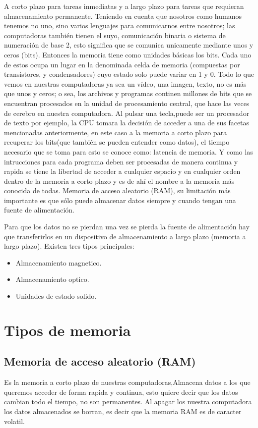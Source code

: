 \documentclass{article}
\begin{document}
A corto plazo para tareas inmediatas y a largo plazo para tareas que requieran almacenamiento permanente. Teniendo en cuenta que nosotros como humanos tenemos no uno, sino varios lenguajes para comunicarnos entre nosotros; las computadoras también tienen el suyo, comunicación binaria o sistema de numeración de base 2, esto significa que se comunica unicamente mediante unos y ceros (bits). Entonces la memoria tiene como unidades básicas los bits. Cada uno de estos ocupa un lugar en la denominada celda de memoria (compuestas por transistores, y condensadores) cuyo estado solo puede variar en 1 y 0. Todo lo que vemos en nuestras computadoras ya sea un vídeo, una imagen, texto, no es más que unos y ceros; o sea, los archivos y programas continen millones de bits que se encuentran procesados en la unidad de procesamiento central, que hace las veces de cerebro en nuestra computadora. Al pulsar una tecla,puede ser un procesador de texto por ejemplo, la CPU tomara la decisión de acceder a una de sus facetas mencionadas anteriormente, en este caso a la memoria a corto plazo para recuperar los bits(que también se pueden entender como datos), el tiempo necesario que se toma para esto se conoce como: latencia de memoria. Y como las intrucciones para cada programa deben ser procesadas de manera continua y rapida se tiene la libertad de acceder a cualquier espacio y en cualquier orden dentro de la memoria a corto plazo y es de ahí el nombre a la memoria más conocida de todas. Memoria de acceso aleatorio (RAM), su limitación más importante es que sólo puede almacenar datos siempre y cuando tengan una fuente de alimentación.
\vspace{0.2cm}

Para que los datos no se pierdan una vez se pierda la fuente de alimentación hay que transferirlos en un dispositivo de almacenamiento a largo plazo (memoria a largo plazo). Existen tres tipos principales:
\begin{itemize}
\item Almacenamiento magnetico.
\item Almacenamiento optico.
\item Unidades de estado solido.
\end{itemize}
\section{Tipos de memoria}
\subsection{Memoria de acceso aleatorio (RAM)}
Es la memoria a corto plazo de nuestras computadoras,Almacena datos a los que queremos acceder de forma rapida y continua, esto quiere decir que los datos cambian todo el tiempo, no son permanentes. Al apagar los nuestra computadora los datos almacenados se borran, es decir que la memoria RAM es de caracter volatil.
\end{document}
